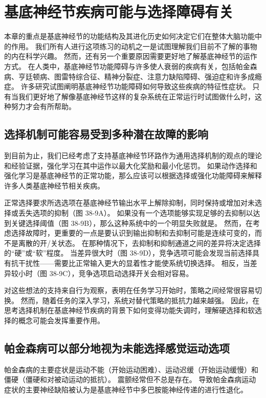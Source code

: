 \section{基底神经节疾病可能与选择障碍有关}
本章的重点是基底神经节的功能结构及其进化历史如何决定它们在整体大脑功能中的作用。 我们所有人进行这项练习的动机之一是试图理解我们目前不了解的事物的内在科学兴趣。 然而，还有另一个重要原因需要更好地了解基底神经节的运作方式。 在人类中，基底神经节功能障碍与许多使人衰弱的疾病有关，包括帕金森病、亨廷顿病、图雷特综合征、精神分裂症、注意力缺陷障碍、强迫症和许多成瘾症。 许多研究试图阐明基底神经节功能障碍如何导致这些疾病的特征性症状。 只有当我们更好地了解像基底神经节这样的复杂系统在正常运行时试图做什么时，这种努力才会有所帮助。

\subsection{选择机制可能容易受到多种潜在故障的影响}
到目前为止，我们已经考虑了支持基底神经节环路作为通用选择机制的观点的理论和经验证据，强化学习在其中运作以最大化奖励和最小化惩罚。 如果动作选择和强化学习是基底神经节的正常功能，那么应该可以根据选择或强化功能障碍来解释许多人类基底神经节相关疾病。

正常选择要求所选选项在基底神经节输出水平上解除抑制，同时保持或增加对未选择或丢失选项的抑制（图 38-9A）。 如果没有一个选项能够实现足够的去抑制以达到关键选择阈值（图 38-9B），那么这种系统中的一个明显失败就是。 然而，在考虑选择故障时，更重要的一点是要认识到输出抑制和去抑制可能是连续可变的，而不是离散的开/关状态。 在那种情况下，去抑制和抑制通道之间的差异将决定选择的“硬”或“软”程度。 当差异很大时（图 38-9D），竞争选项可能会发现当前选择具有抗干扰性——需要比正常输入更大的显着性才能使系统切换选择。 相反，当差异较小时（图 38-9C），竞争选项启动选择开关会相对容易。

对这些想法的支持来自行为观察，表明在任务学习开始时，策略之间经常很容易切换。 然而，随着任务的深入学习，系统对替代策略的抵抗力越来越强。 因此，在思考选择机制在基底神经节疾病的背景下如何变得功能失调时，理解硬选择和软选择的概念可能会发挥重要作用。

\subsection{帕金森病可以部分地视为未能选择感觉运动选项}
帕金森病的主要症状是运动不能（开始运动困难）、运动迟缓（开始运动缓慢）和僵硬（僵硬和对被动运动的抵抗）。 震颤经常但不总是存在。 导致帕金森病运动症状的主要神经缺陷被认为是基底神经节中多巴胺能神经传递的进行性退化。

